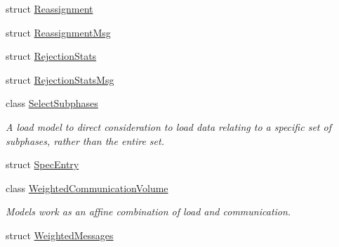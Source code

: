 \begin{DoxyCompactItemize}
\item 
struct \hyperlink{structvt_1_1vrt_1_1collection_1_1balance_1_1_reassignment}{Reassignment}
\item 
struct \hyperlink{structvt_1_1vrt_1_1collection_1_1balance_1_1_reassignment_msg}{Reassignment\+Msg}
\item 
struct \hyperlink{structvt_1_1vrt_1_1collection_1_1balance_1_1_rejection_stats}{Rejection\+Stats}
\item 
struct \hyperlink{structvt_1_1vrt_1_1collection_1_1balance_1_1_rejection_stats_msg}{Rejection\+Stats\+Msg}
\item 
class \hyperlink{classvt_1_1vrt_1_1collection_1_1balance_1_1_select_subphases}{Select\+Subphases}
\begin{DoxyCompactList}\small\item\em A load model to direct consideration to load data relating to a specific set of subphases, rather than the entire set. \end{DoxyCompactList}\item 
struct \hyperlink{structvt_1_1vrt_1_1collection_1_1balance_1_1_spec_entry}{Spec\+Entry}
\item 
class \hyperlink{classvt_1_1vrt_1_1collection_1_1balance_1_1_weighted_communication_volume}{Weighted\+Communication\+Volume}
\begin{DoxyCompactList}\small\item\em Models work as an affine combination of load and communication. \end{DoxyCompactList}\item 
struct \hyperlink{structvt_1_1vrt_1_1collection_1_1balance_1_1_weighted_messages}{Weighted\+Messages}
\end{DoxyCompactItemize}
